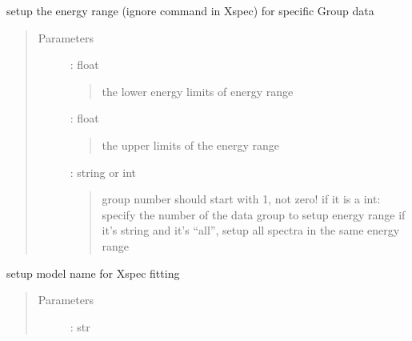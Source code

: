 \documentclass[letterpaper,10pt,english]{sphinxmanual}
\begin{document}
\begin{fulllineitems}
\begin{fulllineitems}
\end{fulllineitems}


\begin{fulllineitems}
\label{\detokenize{APIdocs/xspecanalysis:ixpetools.xspeclib.io.XspecSpec.set_energy}}
\sphinxAtStartPar
setup the energy range (ignore command in Xspec)
for specific Group data
\begin{quote}\begin{description}
\item[{Parameters}] \leavevmode
\sphinxAtStartPar
{} : float
\begin{quote}

\sphinxAtStartPar
the lower energy limits of energy range
\end{quote}

\sphinxAtStartPar
{} : float
\begin{quote}

\sphinxAtStartPar
the upper limits of the energy range
\end{quote}

\sphinxAtStartPar
{} : string or int
\begin{quote}

\sphinxAtStartPar
group number should start with 1, not zero!
if it is a int: specify the number of the data group to
setup energy range
if it’s string and it’s “all”, setup all spectra in the
same energy range
\end{quote}

\end{description}\end{quote}

\end{fulllineitems}


\begin{fulllineitems}
\label{\detokenize{APIdocs/xspecanalysis:ixpetools.xspeclib.io.XspecSpec.set_model}}
\sphinxAtStartPar
setup model name for Xspec fitting
\begin{quote}\begin{description}
\item[{Parameters}] \leavevmode
\sphinxAtStartPar
{} : str
\begin{quote}


\end{quote}
\end{description}
\end{quote}
\end{fulllineitems}
\end{fulllineitems}
\end{document}
